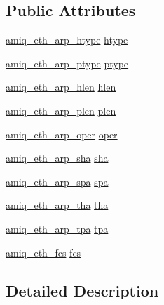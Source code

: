 \subsection*{Public Attributes}
\begin{DoxyCompactItemize}
\item 
\hyperlink{amiq__eth__types_8cpp_a57d82b862801f170752f3b81ae948838}{amiq\_\-eth\_\-arp\_\-htype} \hyperlink{classamiq__eth__packet__arp_ad68808d1acee5cca1aa1018d5178fd70}{htype}
\item 
\hyperlink{amiq__eth__types_8cpp_a669fee937518599516130e8fe7bc36ad}{amiq\_\-eth\_\-arp\_\-ptype} \hyperlink{classamiq__eth__packet__arp_a7a92908295901d6f1a977202a5cb0af4}{ptype}
\item 
\hyperlink{amiq__eth__types_8cpp_a6b0331d6087c47be9890ff13c58c7615}{amiq\_\-eth\_\-arp\_\-hlen} \hyperlink{classamiq__eth__packet__arp_ad86a177f701e6128715273f80c531254}{hlen}
\item 
\hyperlink{amiq__eth__types_8cpp_a84b5cd928120d73e6a70df7e5ace5777}{amiq\_\-eth\_\-arp\_\-plen} \hyperlink{classamiq__eth__packet__arp_a64075c60ab6794a6ebfe0f319a7a7ae1}{plen}
\item 
\hyperlink{amiq__eth__types_8cpp_abc7e041795089b26a090e6d70ba77a33}{amiq\_\-eth\_\-arp\_\-oper} \hyperlink{classamiq__eth__packet__arp_a3e338c8338dc370a062e3548b1d5eb57}{oper}
\item 
\hyperlink{amiq__eth__types_8cpp_ab974d6b9f451dd6be0fffe403faa3954}{amiq\_\-eth\_\-arp\_\-sha} \hyperlink{classamiq__eth__packet__arp_a5e72287f1472bf6abeebb375213a9ce1}{sha}
\item 
\hyperlink{amiq__eth__types_8cpp_a96d988e11990ba5d16bb61e9a2bb02fc}{amiq\_\-eth\_\-arp\_\-spa} \hyperlink{classamiq__eth__packet__arp_abbebf95b682baec2273e44d79cecd52b}{spa}
\item 
\hyperlink{amiq__eth__types_8cpp_a53650a3ccfac473befae378c0f463783}{amiq\_\-eth\_\-arp\_\-tha} \hyperlink{classamiq__eth__packet__arp_a68f413bad7f92628c8f5d7a4fadf04d3}{tha}
\item 
\hyperlink{amiq__eth__types_8cpp_acdb620684aa5dea9eda90d536bfeb5d7}{amiq\_\-eth\_\-arp\_\-tpa} \hyperlink{classamiq__eth__packet__arp_a5bb380a2871707d3aabe84617951fde3}{tpa}
\item 
\hyperlink{amiq__eth__types_8cpp_adb511dc715b55539c6abdad1de981a9f}{amiq\_\-eth\_\-fcs} \hyperlink{classamiq__eth__packet__arp_ac30a0aba3c6f9178fba78dcc1dd6327e}{fcs}
\end{DoxyCompactItemize}


\subsection{Detailed Description}


